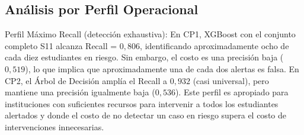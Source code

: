\documentclass[12pt, letterpaper, openany]{report}
\begin{document}
\begin{table}[!htbp]
  \centering
  \caption{Seis modelos finales seleccionados: tres perfiles operacionales por checkpoint. Búsqueda global entre todas las familias (LR, DT, RF, XGB) y conjuntos de características, con AUC-ROC $\geq 0{,}75$ como requisito previo. Métricas = media $\pm$ desviación estándar sobre 5 folds LOSO.}
  \label{tab:modelos_finales}
  \small
\end{table}

\FloatBarrier

\subsection{Análisis por Perfil Operacional}

Perfil Máximo Recall (detección exhaustiva): En CP1, XGBoost con el conjunto completo S11 alcanza Recall = $0{,}806$, identificando aproximadamente ocho de cada diez estudiantes en riesgo. Sin embargo, el costo es una precisión baja ($0{,}519$), lo que implica que aproximadamente una de cada dos alertas es falsa. En CP2, el Árbol de Decisión amplía el Recall a $0{,}932$ (casi universal), pero mantiene una precisión igualmente baja ($0{,}536$). Este perfil es apropiado para instituciones con suficientes recursos para intervenir a todos los estudiantes alertados y donde el costo de no detectar un caso en riesgo supera el costo de intervenciones innecesarias.
\end{document}
